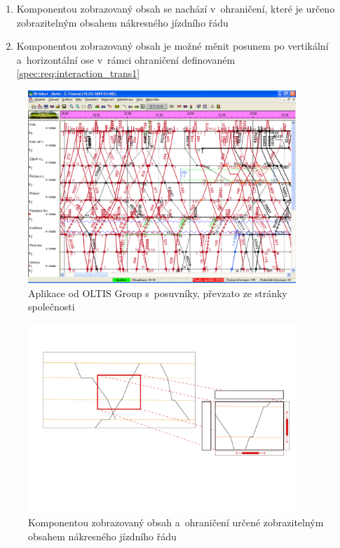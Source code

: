 \begin{enumerate}[label=\color{reqcolor}\textbf{R{\arabic*}}]
	\item \label{spec:req:interaction_trans1} Komponentou zobrazovaný obsah se nachází v~ohraničení, které je určeno zobrazitelným obsahem nákresného jízdního řádu
	\item \label{spec:req:interaction_trans2} Komponentou zobrazovaný obsah je možné měnit posunem po vertikální a~horizontální ose v~rámci ohraničení definovaném \ref{spec:req:interaction_trans1}
\end{enumerate}

\begin{figure}[!htb]
	\centering
	\includegraphics[width=0.9\textwidth]{../img/kap1_ISOR_window}
	\caption{Aplikace od OLTIS Group s~posuvníky, převzato ze stránky společnosti~\cite{ISOR_CDS}}
	\label{fig:spec:oltis_grafikon}
\end{figure}

\begin{figure}[!htb]
	\centering
	\includegraphics[width=0.9\textwidth]{../img/kap2_ohraniceni_definice}
	\caption{Komponentou zobrazovaný obsah a~ohraničení určené zobrazitelným obsahem nákresného jízdního řádu}
	\label{fig:spec:border}
\end{figure}

